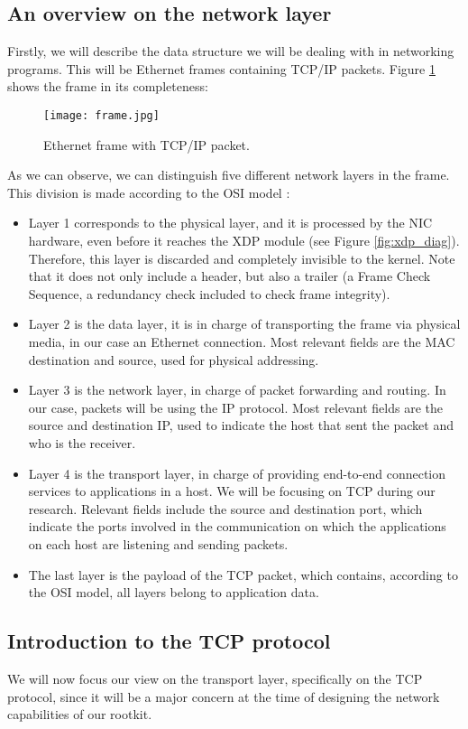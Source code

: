 \subsection{An overview on the network layer}
Firstly, we will describe the data structure we will be dealing with in networking programs. This will be Ethernet frames containing TCP/IP packets. Figure \ref{fig:frame} shows the frame in its completeness:

\begin{figure}[htbp]
	\centering
	\texttt{[image: frame.jpg]}
	\caption{Ethernet frame with TCP/IP packet.}
	\label{fig:frame}
\end{figure}

As we can observe, we can distinguish five different network layers in the frame. This division is made according to the OSI model \cite{network_layers}:
\begin{itemize}
\item Layer 1 corresponds to the physical layer, and it is processed by the NIC hardware, even before it reaches the XDP module (see Figure \ref{fig:xdp_diag}). Therefore, this layer is discarded and completely invisible to the kernel. Note that it does not only include a header, but also a trailer (a Frame Check Sequence, a redundancy check included to check frame integrity).
\item Layer 2 is the data layer, it is in charge of transporting the frame via physical media, in our case an Ethernet connection. Most relevant fields are the MAC destination and source, used for physical addressing.
\item Layer 3 is the network layer, in charge of packet forwarding and routing. In our case, packets will be using the IP protocol. Most relevant fields are the source and destination IP, used to indicate the host that sent the packet and who is the receiver.
\item Layer 4 is the transport layer, in charge of providing end-to-end connection services to applications in a host. We will be focusing on TCP during our research. Relevant fields include the source and destination port, which indicate the ports involved in the communication on which the applications on each host are listening and sending packets.
\item The last layer is the payload of the TCP packet, which contains, according to the OSI model, all layers belong to application data.
\end{itemize}


\subsection{Introduction to the TCP protocol} \label{subsection:tcp}
We will now focus our view on the transport layer, specifically on the TCP protocol, since it will be a major concern at the time of designing the network capabilities of our rootkit.

